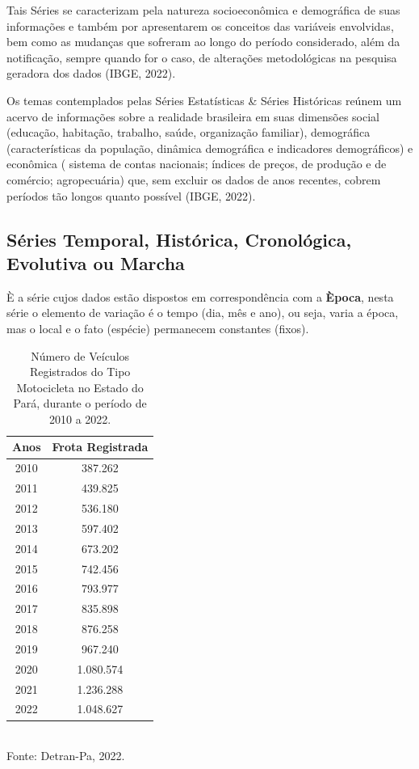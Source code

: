 Tais Séries se caracterizam pela natureza socioeconômica e demográfica de suas informações e também por apresentarem os conceitos das variáveis envolvidas, bem como as mudanças que sofreram ao longo do período considerado, além da notificação, sempre quando for o caso, de alterações metodológicas na pesquisa geradora dos dados (IBGE, 2022).\vskip0.3cm

Os temas contemplados pelas Séries Estatísticas \& Séries Históricas reúnem um acervo de informações sobre a realidade brasileira em suas dimensões social (educação, habitação, trabalho, saúde, organização familiar), demográfica (características da população, dinâmica demográfica e indicadores demográficos) e econômica ( sistema de contas nacionais; índices de preços, de produção e de comércio; agropecuária) que, sem excluir os dados de anos recentes, cobrem períodos tão longos quanto possível (IBGE, 2022).





\newpage 
\subsection{Séries Temporal, Histórica, Cronológica, Evolutiva ou Marcha}

\inic È a série cujos dados estão dispostos em correspondência
com a \textbf{Època}, nesta série o elemento de variação é o tempo (dia,
mês e ano), ou seja, varia a época, mas o local e o fato (espécie)
permanecem constantes (fixos).


\begin{table}[!htb]
    \centering
    {
    \caption{Número de Veículos Registrados do Tipo Motocicleta no Estado do Pará, durante o período de 2010 a 2022.}
    \label{obitos}
    \vspace{0.1cm}
\begin{tabular}{c|c}
  \hline\hline
  Anos   & Frota Registrada \\
  \hline\hline
  2010   & 387.262  \\
  2011   & 439.825 \\
  2012   & 536.180  \\
  2013   & 597.402  \\
  2014   & 673.202 \\
  2015   & 742.456 \\
  2016   & 793.977 \\
  2017   & 835.898 \\
  2018   & 876.258 \\
  2019   & 967.240 \\
  2020   & 1.080.574 \\
  2021   & 1.236.288 \\
  2022   & 1.048.627   \\
  \hline\hline
\end{tabular}}
\\
\hspace{-1.0cm}
Fonte: Detran-Pa, 2022.
\end{table}


